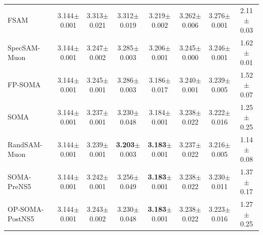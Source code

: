 \begin{table}[t]
{\begin{tabular}{lccccccc}
    FSAM & 3.144{\scriptsize$\pm$0.001} & 3.313{\scriptsize$\pm$0.021} & 3.312{\scriptsize$\pm$0.019} & 3.219{\scriptsize$\pm$0.002} & 3.262{\scriptsize$\pm$0.006} & 3.276{\scriptsize$\pm$0.001} & 2.11{\scriptsize$\pm$0.03} \\
    SpecSAM-Muon & 3.144{\scriptsize$\pm$0.001} & 3.247{\scriptsize$\pm$0.002} & 3.285{\scriptsize$\pm$0.003} & 3.206{\scriptsize$\pm$0.001} & 3.245{\scriptsize$\pm$0.000} & 3.246{\scriptsize$\pm$0.001} & 1.62{\scriptsize$\pm$0.01} \\
    FP-SOMA & 3.144{\scriptsize$\pm$0.001} & 3.245{\scriptsize$\pm$0.001} & 3.286{\scriptsize$\pm$0.003} & 3.186{\scriptsize$\pm$0.017} & 3.240{\scriptsize$\pm$0.001} & 3.239{\scriptsize$\pm$0.005} & 1.52{\scriptsize$\pm$0.07} \\
    SOMA & 3.144{\scriptsize$\pm$0.001} & 3.237{\scriptsize$\pm$0.001} & 3.230{\scriptsize$\pm$0.048} & 3.184{\scriptsize$\pm$0.001} & 3.238{\scriptsize$\pm$0.022} & 3.222{\scriptsize$\pm$0.016} & 1.25{\scriptsize$\pm$0.25} \\
    RandSAM-Muon & 3.144{\scriptsize$\pm$0.001} & 3.239{\scriptsize$\pm$0.001} & \textbf{3.203}{\scriptsize$\pm$0.003} & \textbf{3.183}{\scriptsize$\pm$0.001} & 3.237{\scriptsize$\pm$0.022} & 3.216{\scriptsize$\pm$0.005} & 1.14{\scriptsize$\pm$0.08} \\
    SOMA-PreNS5 & 3.144{\scriptsize$\pm$0.001} & 3.242{\scriptsize$\pm$0.001} & 3.256{\scriptsize$\pm$0.049} & \textbf{3.183}{\scriptsize$\pm$0.001} & 3.238{\scriptsize$\pm$0.022} & 3.230{\scriptsize$\pm$0.011} & 1.37{\scriptsize$\pm$0.17} \\
    OP-SOMA-PostNS5 & 3.144{\scriptsize$\pm$0.001} & 3.243{\scriptsize$\pm$0.002} & 3.230{\scriptsize$\pm$0.048} & \textbf{3.183}{\scriptsize$\pm$0.001} & 3.238{\scriptsize$\pm$0.022} & 3.223{\scriptsize$\pm$0.016} & 1.27{\scriptsize$\pm$0.25} \\
    \bottomrule
  \end{tabular}}
\end{table}
